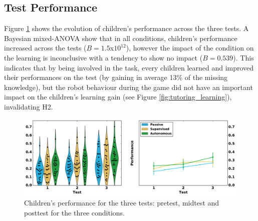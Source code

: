 %


\subsection{Test Performance}

Figure \ref{fig:tutoring_performance} shows the evolution of children's performance across the three tests. A Bayesian mixed-ANOVA show that in all conditions, children's performance increased across the tests ($B=1.5$x$10^{12}$), however the impact of the condition on the learning is inconclusive with a tendency to show no impact ($B=0.539$). This indicates that by being involved in the task, every children learned and improved their performances on the test (by gaining in average 13\% of the missing knowledge), but the robot behaviour during the game did not have an important impact on the children's learning gain (see Figure \ref{fig:tutoring_learning}), invalidating H2.

\begin{figure}[ht]
	\includegraphics[width=1\linewidth]{perf.pdf}
	\centering
	\caption{Children's performance for the three tests: pretest, midtest and posttest for the three conditions.}
	\label{fig:tutoring_performance}
\end{figure}

